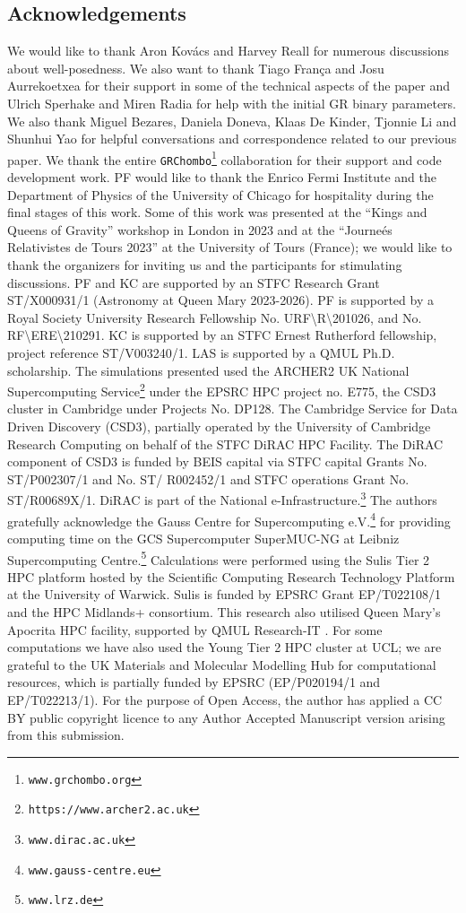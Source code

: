 \documentclass[reprint,aps,amsmath,amssymb,twoside,prd,showkeys,superscriptaddress,nofootinbib]{revtex4-2}
\begin{document}
\subsection*{Acknowledgements}
We would like to thank Aron Kov\'acs and Harvey Reall for numerous discussions about well-posedness. We also want to thank Tiago Fran\c{c}a and Josu Aurrekoetxea for their support in some of the technical aspects of the paper and Ulrich Sperhake and Miren Radia for help with the initial GR binary parameters. We also thank Miguel Bezares, Daniela Doneva, Klaas De Kinder, Tjonnie Li and Shunhui Yao for helpful conversations and correspondence related to our previous paper.
We thank the entire \texttt{GRChombo}\footnote{\texttt{www.grchombo.org}} collaboration for their support and code development work. PF would like to thank the Enrico Fermi Institute and the Department of Physics of the University of Chicago for hospitality during the final stages of this work. Some of this work was presented at the ``Kings and Queens of Gravity'' workshop in London in 2023 and at the ``Journe\'es Relativistes de Tours 2023'' at the University of Tours (France); we would like to thank the organizers for inviting us and the participants for stimulating discussions. PF and KC are supported by an STFC Research Grant ST/X000931/1 (Astronomy at Queen Mary 2023-2026). PF is supported by a Royal Society University Research Fellowship  No. URF\textbackslash R\textbackslash 201026, and No. RF\textbackslash ERE\textbackslash 210291. KC is supported by an STFC Ernest Rutherford fellowship, project reference ST/V003240/1. LAS is supported by a QMUL Ph.D. scholarship. The simulations presented used the ARCHER2 UK National Supercomputing Service\footnote{\texttt{https://www.archer2.ac.uk}} under the EPSRC HPC project no. E775, the CSD3 cluster in Cambridge under Projects No. DP128. The Cambridge Service for Data Driven Discovery (CSD3), partially operated by the University of Cambridge Research Computing on behalf of the STFC DiRAC HPC Facility. The DiRAC component of CSD3 is funded by BEIS capital via STFC capital Grants No. ST/P002307/1 and No. ST/ R002452/1 and STFC operations Grant No. ST/R00689X/1. DiRAC is part of the National e-Infrastructure.\footnote{\texttt{www.dirac.ac.uk}} The authors gratefully acknowledge the Gauss Centre for Supercomputing e.V.\footnote{\texttt{www.gauss-centre.eu}} for providing computing time on the GCS Supercomputer SuperMUC-NG at Leibniz Supercomputing Centre.\footnote{\texttt{www.lrz.de}} Calculations were performed using the Sulis Tier 2 HPC platform hosted by the Scientific Computing Research Technology Platform at the University of Warwick. Sulis is funded by EPSRC Grant EP/T022108/1 and the HPC Midlands+ consortium. This research also
utilised Queen Mary’s Apocrita HPC facility, supported
by QMUL Research-IT \cite{apocrita}. For some computations we have also used the Young Tier 2 HPC cluster at UCL; we are grateful to the UK Materials
and Molecular Modelling Hub for computational resources, which is partially funded by
EPSRC (EP/P020194/1 and EP/T022213/1). For the purpose of Open Access, the author has applied a
CC BY public copyright licence to any Author Accepted
Manuscript version arising from this submission.
\end{document}
